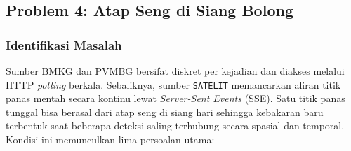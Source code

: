 \subsection{Problem 4: Atap Seng di Siang Bolong}

\subsubsection{Identifikasi Masalah}

Sumber BMKG dan PVMBG bersifat diskret per kejadian dan diakses melalui HTTP \textit{polling} berkala. Sebaliknya, sumber \texttt{SATELIT} memancarkan aliran titik panas mentah secara kontinu lewat \textit{Server-Sent Events} (SSE). Satu titik panas tunggal bisa berasal dari atap seng di siang hari sehingga kebakaran baru terbentuk saat beberapa deteksi saling terhubung secara spasial dan temporal. Kondisi ini memunculkan lima persoalan utama:

